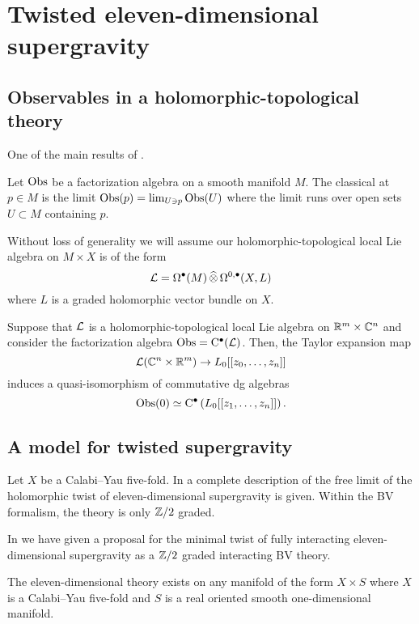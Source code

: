 \documentclass[11pt]{amsart}
\begin{document}
\section{Twisted eleven-dimensional supergravity}

\subsection{Observables in a holomorphic-topological theory}

One of the main results of \cite{CG2}.

\begin{dfn} 
Let ${\rm Obs}$ be a factorization algebra on a smooth manifold $M$.
The classical  at $p \in M$ is the limit ${\rm Obs}(p) = \lim_{U \ni p} {\rm Obs}(U)$ where the limit runs over open sets $U \subset M$ containing $p$.
\end{dfn}

\parsec

Without loss of generality we will assume our holomorphic-topological local Lie algebra on $M \times X$ is of the form
\[
\mathcal L = \Omega^\bullet (M) \, \widehat{\otimes} \, \Omega^{0,\bullet}(X, L) 
\]
where $L$ is a graded holomorphic vector bundle on $X$.

\begin{lem}
\label{lem:localops}
Suppose that $\mathcal L$ is a holomorphic-topological local Lie algebra on $\mathbb{R}^m \times \mathbb{C}^n$ and consider the factorization algebra ${\rm Obs} = {\rm C}^\bullet (\mathcal L)$. 
Then, the Taylor expansion map
\[
\mathcal L(\mathbb{C}^n \times \mathbb{R}^m) \to L_0[[z_0,\ldots,z_n]]
\]
induces a quasi-isomorphism of commutative dg algebras
\[
{\rm Obs}(0) \simeq {\rm C}^\bullet \left( L_0[[z_1,\ldots,z_n]] \right) .
\]
\end{lem}

 
\subsection{A model for twisted supergravity}

Let $X$ be a Calabi--Yau five-fold. 
In \cite{SWspinor} a complete description of the free limit of the holomorphic twist of eleven-dimensional supergravity is given. 
Within the BV formalism, the theory is only $\mathbb{Z}/2$ graded.

In \cite{RSW} we have given a proposal for the minimal twist of fully interacting eleven-dimensional supergravity as a $\mathbb{Z}/2$ graded interacting BV theory. 

\parsec[s:fields]
The eleven-dimensional theory exists on any manifold of the form $X \times S$ where $X$ is a Calabi--Yau five-fold and $S$ is a real oriented smooth one-dimensional manifold. 
\end{document}
